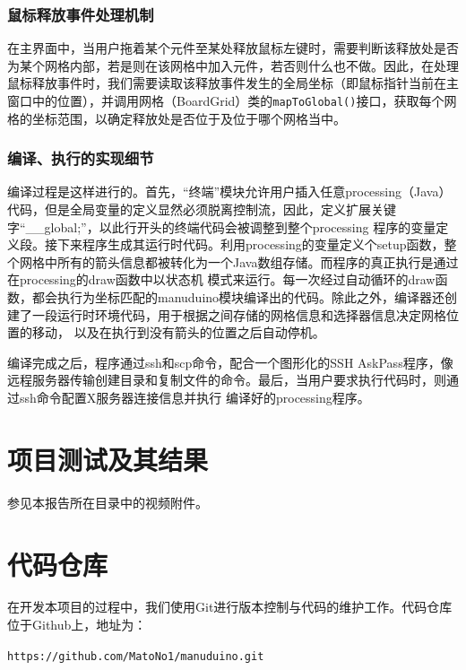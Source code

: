 \documentclass[UTF8]{ctexart}
\begin{document}
\subsubsection{鼠标释放事件处理机制}
在主界面中，当用户拖着某个元件至某处释放鼠标左键时，需要判断该释放处是否为某个网格内部，若是则在该网格中加入元件，若否则什么也不做。因此，在处理鼠标释放事件时，我们需要读取该释放事件发生的全局坐标（即鼠标指针当前在主窗口中的位置），并调用网格（BoardGrid）类的\texttt{mapToGlobal()}接口，获取每个网格的坐标范围，以确定释放处是否位于及位于哪个网格当中。\par
\subsubsection{编译、执行的实现细节}
编译过程是这样进行的。首先，“终端”模块允许用户插入任意processing（Java）代码，但是全局变量的定义显然必须脱离控制流，因此，定义扩展关键字“__global;”，以此行开头的终端代码会被调整到整个processing
程序的变量定义段。接下来程序生成其运行时代码。利用processing的变量定义个setup函数，整个网格中所有的箭头信息都被转化为一个Java数组存储。而程序的真正执行是通过在processing的draw函数中以状态机
模式来运行。每一次经过自动循环的draw函数，都会执行为坐标匹配的manuduino模块编译出的代码。除此之外，编译器还创建了一段运行时环境代码，用于根据之间存储的网格信息和选择器信息决定网格位置的移动，
以及在执行到没有箭头的位置之后自动停机。 \par
编译完成之后，程序通过ssh和scp命令，配合一个图形化的SSH AskPass程序，像远程服务器传输创建目录和复制文件的命令。最后，当用户要求执行代码时，则通过ssh命令配置X服务器连接信息并执行
编译好的processing程序。

\section{项目测试及其结果}
参见本报告所在目录中的视频附件。

\section{代码仓库}
在开发本项目的过程中，我们使用Git进行版本控制与代码的维护工作。代码仓库位于Github上，地址为：\par
\texttt{https://github.com/MatoNo1/manuduino.git}
\end{document}

